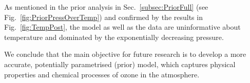 As mentioned in the prior analysis in Sec.~\ref{subsec:PriorFull} (see Fig.~\ref{fig:PriorPressOverTemp}) and confirmed by the results in Fig.~\ref{fig:TempPost}, the model as well as the data are uninformative about temperature and dominated by the exponentially decreasing pressure.

We conclude that the main objective for future research is to develop a more accurate, potentially parametrised (prior) model, which captures physical properties and chemical processes of ozone in the atmosphere.




